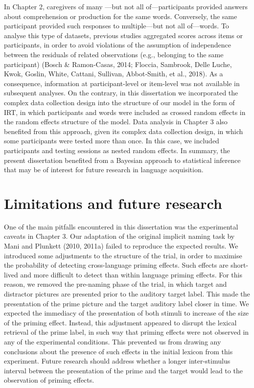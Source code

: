 \documentclass[
  12pt,
  b5paperpaper,
  twoside]{scrreprt}
\begin{document}
In Chapter 2, caregivers of many ---but not all of---participants
provided answers about comprehension or production for the same words.
Conversely, the same participant provided such responses to
multiple---but not all of---words. To analyse this type of datasets,
previous studies aggregated scores across items or participants, in
order to avoid violations of the assumption of independence between the
residuals of related observations (e.g., belonging to the same
participant) (Bosch \& Ramon-Casas, 2014; Floccia, Sambrook, Delle
Luche, Kwok, Goslin, White, Cattani, Sullivan, Abbot‐Smith, et al.,
2018). As a consequence, information at participant-level or item-level
was not available in subsequent analyses. On the contrary, in this
dissertation we incorporated the complex data collection design into the
structure of our model in the form of IRT, in which participants and
words were included as crossed random effects in the random effects
structure of the model. Data analysis in Chapter 3 also benefited from
this approach, given its complex data collection design, in which some
participants were tested more than once. In this case, we included
participants and testing sessions as nested random effects. In summary,
the present dissertation benefited from a Bayesian approach to
statistical inference that may be of interest for future research in
language acquisition.

\hypertarget{limitations-and-future-research}{%
\section{Limitations and future
research}\label{limitations-and-future-research}}

One of the main pitfalls encountered in this dissertation was the
experimental caveats in Chapter 3. Our adaptation of the original
implicit naming task by Mani and Plunkett (2010, 2011a) failed to
reproduce the expected results. We introduced some adjustments to the
structure of the trial, in order to maximise the probability of
detecting cross-language priming effects. Such effects are short-lived
and more difficult to detect than within language priming effects. For
this reason, we removed the pre-naming phase of the trial, in which
target and distractor pictures are presented prior to the auditory
target label. This made the presentation of the prime picture and the
target auditory label closer in time. We expected the immediacy of the
presentation of both stimuli to increase of the size of the priming
effect. Instead, this adjustment appeared to disrupt the lexical
retrieval of the prime label, in such way that priming effects were not
observed in any of the experimental conditions. This prevented us from
drawing any conclusions about the presence of such effects in the
initial lexicon from this experiment. Future research should address
whether a longer inter-stimulus interval between the presentation of the
prime and the target would lead to the observation of priming effects.
\end{document}

